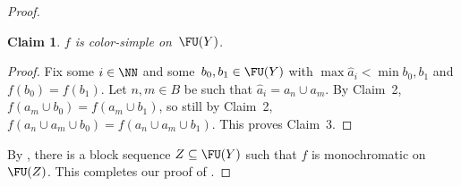 \documentclass{article}
\numberwithin{theorem}{section}
\newtheorem{claim}{Claim}
\begin{document}
\begin{proof}
\begin{claim}
$f$ is color-simple on~$\FU(Y)$.
\end{claim}
\begin{proof}
Fix some $i \in \NN$ and some~$b_0, b_1 \in \FU(Y)$ with $\max \hat a_i < \min b_0, b_1$ and $f(b_0) = f(b_1)$.
Let $n, m \in B$ be such that $\hat a_i = a_n \cup a_m$. By Claim~2, $f(a_m \cup b_0) = f(a_m \cup b_1)$, so still by Claim~2, $f(a_n \cup a_m \cup b_0) = f(a_n \cup a_m \cup b_1)$. This proves Claim~3.
\end{proof}

By , there is a block sequence $Z \subseteq \FU(Y)$ such that $f$ is monochromatic on~$\FU(Z)$. This completes our proof of .
\end{proof}



\end{document}
